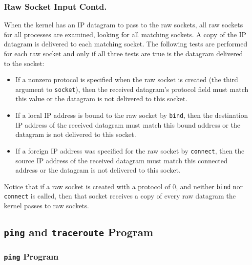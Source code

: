 \documentclass[notes,serif]{beamer}
\begin{document}
\begin{frame}
\frametitle{Raw Socket Input Contd.}
{\scriptsize
When the kernel has an IP datagram to pass to the raw sockets, all raw sockets for all processes are examined, looking for all matching sockets. A copy of the IP datagram is delivered to each matching socket. The following tests are performed for each raw socket and only if all three tests are true is the datagram delivered to the socket:

\begin{itemize}
  \item If a nonzero protocol is specified when the raw socket is created (the third argument to \texttt{socket}), then the received datagram's protocol field must match this value or the datagram is not delivered to this socket.
  \item If a local IP address is bound to the raw socket by \texttt{bind}, then the destination IP address of the received datagram must match this bound address or the datagram is not delivered to this socket.
  \item If a foreign IP address was specified for the raw socket by \texttt{connect}, then the source IP address of the received datagram must match this connected address or the datagram is not delivered to this socket.
\end{itemize}

Notice that if a raw socket is created with a protocol of 0, and neither \texttt{bind} nor \texttt{connect} is called, then that socket receives a copy of every raw datagram the kernel passes to raw sockets.
}
\end{frame}

\subsection{\texttt{ping} and \texttt{traceroute} Program}
\begin{frame}
\frametitle{\texttt{ping} Program}
\end{frame}
\end{document}

